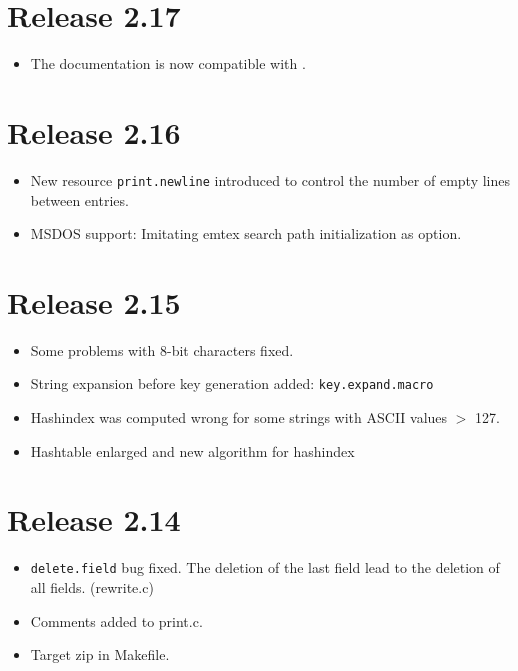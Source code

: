 \documentclass[11pt,a4paper]{scrartcl}
\newcommand\rsc[1]{\texttt{#1}}
\newcommand\File[1]{\textsf{#1}}
\newenvironment{Release}[2]{\section*{Release #1}\begin{itemize}}{\end{itemize}}
\newenvironment{Fix}[1]{\item }{}
\newenvironment{New}[1]{\item }{}
\newenvironment{Doc}[1]{\item }{}
\newenvironment{Update}[1]{\item }{}
\begin{document}
 \begin{Release}{2.17}{}
  \begin{Doc}{gene}
    The documentation is now compatible with \LaTeXe.
  \end{Doc}
 \end{Release}

 \begin{Release}{2.16}{}
  \begin{New}{gene}
    New resource \rsc{print.newline} introduced to control the
    number of empty lines between entries.
  \end{New}
  \begin{New}{gene}
    MSDOS support: Imitating emtex search path initialization as
    option.
  \end{New}
 \end{Release}

 \begin{Release}{2.15}{}
  \begin{Fix}{gene}
    Some problems with 8-bit characters fixed.
  \end{Fix}
  \begin{New}{gene}
    String expansion before key generation added:
    \rsc{key.expand.macro}
  \end{New}
  \begin{Fix}{gene}
    Hashindex was computed wrong for some strings with ASCII values $>$
    127.
  \end{Fix}
  \begin{Update}{gene}
    Hashtable enlarged and new algorithm for hashindex
  \end{Update}
 \end{Release}

 \begin{Release}{2.14}{}
  \begin{Fix}{gene}
    \rsc{delete.field} bug fixed. The deletion of the last
    field lead to the deletion of all fields. (\File{rewrite.c})
  \end{Fix}
  \begin{Update}{gene}
    Comments added to \File{print.c}.
  \end{Update}
  \begin{New}{gene}
    Target zip in \File{Makefile}.
  \end{New}
 \end{Release}
\end{document}
